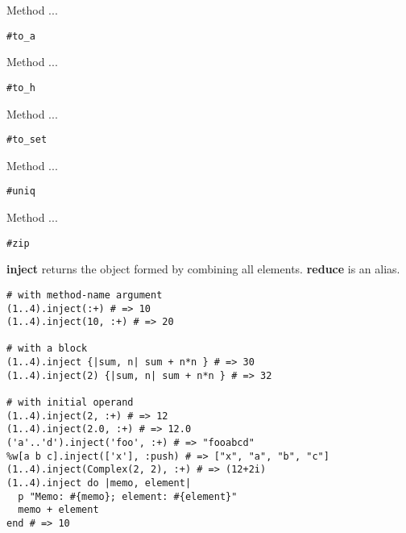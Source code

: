 Method ...
\begin{verbatim}
#to_a
\end{verbatim}

Method ...
\begin{verbatim}
#to_h
\end{verbatim}

Method ...
\begin{verbatim}
#to_set
\end{verbatim}

Method ...
\begin{verbatim}
#uniq
\end{verbatim}

Method ...
\begin{verbatim}
#zip
\end{verbatim}

\textbf{inject} returns the object formed by combining all elements.
\textbf{reduce} is an alias.
\begin{verbatim}
# with method-name argument
(1..4).inject(:+) # => 10
(1..4).inject(10, :+) # => 20

# with a block
(1..4).inject {|sum, n| sum + n*n } # => 30
(1..4).inject(2) {|sum, n| sum + n*n } # => 32

# with initial operand
(1..4).inject(2, :+) # => 12
(1..4).inject(2.0, :+) # => 12.0
('a'..'d').inject('foo', :+) # => "fooabcd"
%w[a b c].inject(['x'], :push) # => ["x", "a", "b", "c"]
(1..4).inject(Complex(2, 2), :+) # => (12+2i)
(1..4).inject do |memo, element|
  p "Memo: #{memo}; element: #{element}"
  memo + element
end # => 10
\end{verbatim}